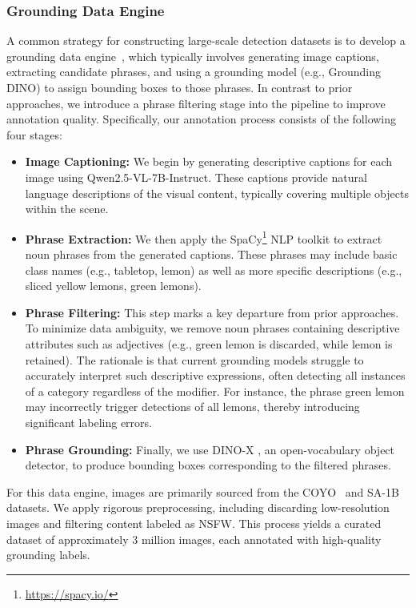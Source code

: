 \subsubsection{Grounding Data Engine}

A common strategy for constructing large-scale detection datasets is to develop a grounding data engine~\cite{jiang2024t, ren2024dino, ren2024grounding, cheng2024yolo, peng2023kosmos2}, which typically involves generating image captions, extracting candidate phrases, and using a grounding model (e.g., Grounding DINO) to assign bounding boxes to those phrases. In contrast to prior approaches, we introduce a phrase filtering stage into the pipeline to improve annotation quality. Specifically, our annotation process consists of the following four stages:

\begin{itemize}
    \item \textbf{Image Captioning:} We begin by generating descriptive captions for each image using Qwen2.5-VL-7B-Instruct. These captions provide natural language descriptions of the visual content, typically covering multiple objects within the scene.
    \item \textbf{Phrase Extraction:} We then apply the SpaCy\footnote{\url{https://spacy.io/}} NLP toolkit to extract noun phrases from the generated captions. These phrases may include basic class names (e.g., tabletop, lemon) as well as more specific descriptions (e.g., sliced yellow lemons, green lemons).
    \item \textbf{Phrase Filtering:} This step marks a key departure from prior approaches. To minimize data ambiguity, we remove noun phrases containing descriptive attributes such as adjectives (e.g., green lemon is discarded, while lemon is retained). The rationale is that current grounding models struggle to accurately interpret such descriptive expressions, often detecting all instances of a category regardless of the modifier. For instance, the phrase green lemon may incorrectly trigger detections of all lemons, thereby introducing significant labeling errors.
    \item \textbf{Phrase Grounding:} Finally, we use DINO-X \cite{ren2024dino}, an open-vocabulary object detector, to produce bounding boxes corresponding to the filtered phrases.
\end{itemize}

For this data engine, images are primarily sourced from the COYO~\cite{kakaobrain2022coyo-700m} and SA-1B~\cite{TransF:SAM} datasets. We apply rigorous preprocessing, including discarding low-resolution images and filtering content labeled as NSFW. This process yields a curated dataset of approximately 3 million images, each annotated with high-quality grounding labels.

